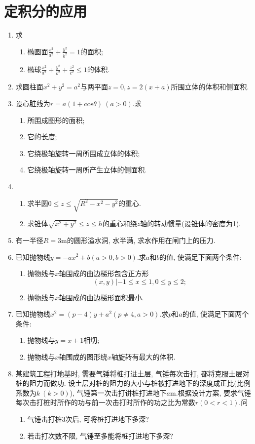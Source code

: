 \section{定积分的应用}
\begin{enumerate}
\item 求
\begin{enumerate}
	\item 椭圆面$\frac{x^2}{a^2}+\frac{y^2}{b^2}=1$的面积;
	\item 椭球$\frac{x^2}{a^2}+\frac{y^2}{b^2}+\frac{z^2}{c^2}\le 1$的体积.
	\end{enumerate}
\item 求圆柱面$x^2+y^2=a^2$与两平面$z=0,z=2(x+a)$所围立体的体积和侧面积.
\item 设心脏线为$r=a(1+\mathrm{cos}\theta)\ (a>0)$.求
\begin{enumerate}
	\item 所围成图形的面积;
	\item 它的长度;
	\item 它绕极轴旋转一周所围成立体的体积;
	\item 它绕极轴旋转一周所产生立体的侧面积.
\end{enumerate}
\item 
\begin{enumerate}
	\item 求半圆$0\le z\le \sqrt{R^2-x^2-y^2}$的重心.
	\item 求锥体$\sqrt{x^2+y^2}\le z\le h$的重心和绕$z$轴的转动惯量(设锥体的密度为1).
\end{enumerate}
\item 有一半径$R=3$m的圆形溢水洞, 水半满, 求水作用在闸门上的压力.
\item 已知抛物线$y=-ax^2+b(a>0,b>0)$.求$a$和$b$的值, 使满足下面两个条件:
\begin{enumerate}
	\item 抛物线与$x$轴围成的曲边梯形包含正方形
	$$ {(x,y)|-1\le x\le 1,0\le y\le 2};$$
	\item 抛物线与$x$轴围成的曲边梯形面积最小.
\end{enumerate}
\item 已知抛物线$x^2=(p-4)y+a^2(p\ne 4,a>0)$.求$p$和$a$的值, 使满足下面两个条件:
\begin{enumerate}
	\item 抛物线与$y=x+1$相切;
	\item 抛物线与$x$轴围成的图形绕$x$轴旋转有最大的体积.
\end{enumerate}
\item 某建筑工程打地基时, 需要气锤将桩打进土层, 气锤每次击打, 都将克服土层对桩的阻力而做功. 设土层对桩的阻力的大小与桩被打进地下的深度成正比(比例系数为$k\ (k>0)$), 气锤第一次击打讲桩打进地下$a$m.根据设计方案, 要求气锤每次击打桩时所作的功与前一次击打时所作的功之比为常数$r(0<r<1)$.问
\begin{enumerate}
	\item 气锤击打桩3次后, 可将桩打进地下多深?
	\item 若击打次数不限, 气锤至多能将桩打进地下多深?
\end{enumerate}
\end{enumerate}
